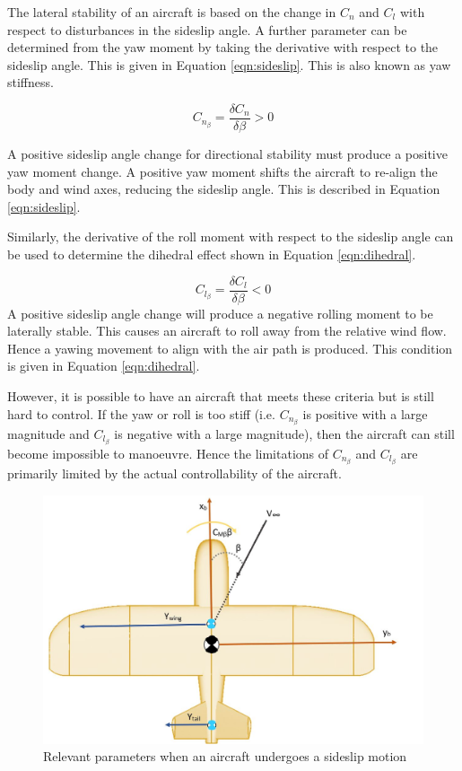 The lateral stability of an aircraft is based on the change in $C_n$ and $C_l$ with respect to disturbances in the sideslip angle. A further parameter can be determined from the yaw moment by taking the derivative with respect to the sideslip angle. This is given in Equation \ref{eqn:sideslip}. This is also known as yaw stiffness.

\begin{equation}
    C_{n_\beta} = \frac{\delta C_n}{\delta \beta} > 0
    \label{eqn:sideslip}
\end{equation}


A positive sideslip angle change for directional stability must produce a positive yaw moment change. A positive yaw moment shifts the aircraft to re-align the body and wind axes, reducing the sideslip angle. This is described in Equation \ref{eqn:sideslip}. 

Similarly, the derivative of the roll moment with respect to the sideslip angle can be used to determine the dihedral effect shown in Equation \ref{eqn:dihedral}.

\begin{equation}
    C_{l_\beta} = \frac{\delta C_l}{\delta \beta} < 0
    \label{eqn:dihedral}
\end{equation}
A positive sideslip angle change will produce a negative rolling moment to be laterally stable. This causes an aircraft to roll away from the relative wind flow. Hence a yawing movement to align with the air path is produced. This condition is given in Equation \ref{eqn:dihedral}. 

However, it is possible to have an aircraft that meets these criteria but is still hard to control. If the yaw or roll is too stiff (i.e. $C_{n_\beta}$ is positive with a large magnitude and $C_{l_\beta}$ is negative with a large magnitude), then the aircraft can still become impossible to manoeuvre. Hence the limitations of $C_{n_\beta}$ and $C_{l_\beta}$ are primarily limited by the actual controllability of the aircraft. 




\begin{figure}[H]
  \centering
   \includegraphics[width=0.8\linewidth]{03_LiteratureReview/Figs/sideslip.JPG}
  \caption{Relevant parameters when an aircraft undergoes a sideslip motion}
  \label{fig:sideslip}
\end{figure}

